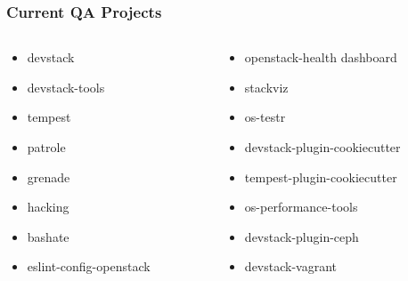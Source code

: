 \documentclass[aspectratio=169,11pt,hyperref={colorlinks=true}]{beamer}
\begin{document}
\begin{frame}
    \frametitle{Current QA Projects}
    \begin{columns}
    \begin{column}{0.5\textwidth}
    \begin{itemize}
        \item{devstack}
        \item{devstack-tools}
        \item{tempest}
        \item{patrole}
        \item{grenade}
        \item{hacking}
        \item{bashate}
        \item{eslint-config-openstack}
    \end{itemize}
    \end{column}
    \begin{column}{0.5\textwidth}
    \begin{itemize}
        \item{openstack-health dashboard}
        \item{stackviz}
        \item{os-testr}
        \item{devstack-plugin-cookiecutter}
        \item{tempest-plugin-cookiecutter}
        \item{os-performance-tools}
        \item{devstack-plugin-ceph}
        \item{devstack-vagrant}
    \end{itemize}
    \end{column}
    \end{columns}
\end{frame}
\end{document}
